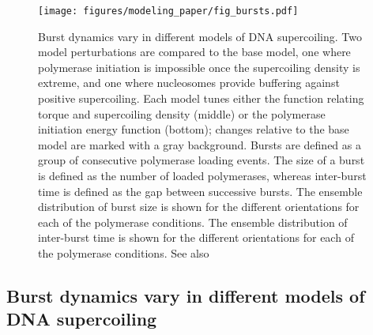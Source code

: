 \documentclass[11pt]{article} %
\begin{document}
\begin{figure}[htbp]
    \centering
    {\texttt{[image: figures/modeling\_paper/fig\_bursts.pdf]}
    \label{fig:perturbation_overview}
    \label{fig:burst_time_cartoon}
    \label{fig:burst_size_dynamics}
    \label{fig:interburst_time_dynamics}
    }
    \caption{Burst dynamics vary in different models of DNA supercoiling.
         Two model perturbations are compared to the base model, one where polymerase initiation is impossible once the supercoiling density is extreme, and one where nucleosomes provide buffering against positive supercoiling. Each model tunes either the function relating torque and supercoiling density (middle) or the polymerase initiation energy function (bottom); changes relative to the base model are marked with a gray background.
         Bursts are defined as a group of consecutive polymerase loading events. The size of a burst is defined as the number of loaded polymerases, whereas inter-burst time is defined as the gap between successive bursts.
         The ensemble distribution of burst size is shown for the different orientations for each of the polymerase conditions.
         The ensemble distribution of inter-burst time is shown for the different orientations for each of the polymerase conditions.
        See also 
    }
    \label{fig:top:bursts}
\end{figure}

\subsection{Burst dynamics vary in different models of DNA supercoiling }
\end{document}
